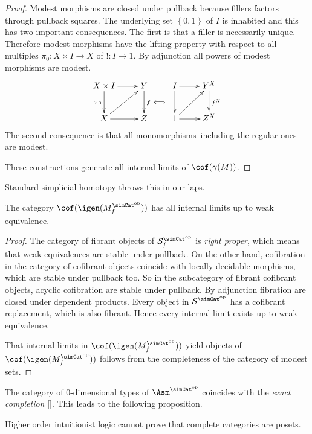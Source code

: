 \documentclass{tac}
\newcommand\cat\mathcal
\newcommand\set[1]{\left\{#1\right\}}
\newcommand\dual{^{\mathrm{op}}}
\newcommand\s{^{\simCat\dual}}
\newcommand\bang{!}
\newcommand\of{:}
\newcommand\f{_f}
\newcommand\gen\gamma
\newcommand\citep[1]{[\cite{#1}]}
\begin{document}
\begin{proof} Modest morphisms are closed under pullback because fillers factors through pullback squares.
The underlying set $\set{0,1}$ of $I$ is inhabited and this has two important consequences. The first is that a filler is necessarily unique. Therefore modest morphisms have the lifting property with respect to all multiples $\pi_0\of X\times I\to X$ of $\bang\of I\to 1$. By adjunction all powers of modest morphisms are modest. 
\[\xymatrix{
X\times I\ar[d]_{\pi_0}\ar[r] & Y\ar[d]^f & I\ar[r]\ar[d] & Y^X\ar[d]^{f^X} \\
X\ar[r]\ar[ur] & Z\ar@{}[ur]|\iff & 1\ar[r]\ar[ur] & Z^X
}\]
The second consequence is that all monomorphisms--including the regular ones--are modest.

These constructions generate all internal limits of $\cof(\gen(M))$.
\end{proof}

Standard simplicial homotopy throws this in our laps.

\begin{proposition} The category $\cof(\igen(M\s\f))$ has all internal limits up to weak equivalence.\label{completeness} \end{proposition}

\begin{proof} The category of fibrant objects of $\cat S\s\f$ is \emph{right proper}, which means that weak equivalences are stable under pullback. On the other hand, cofibration in the category of cofibrant objects coincide with locally decidable morphisms, which are stable under pullback too. So in the subcategory of fibrant cofibrant objects, acyclic cofibration are stable under pullback. By adjunction fibration are closed under dependent products. Every object in $\cat S\s$ has a cofibrant replacement, which is also fibrant. Hence every internal limit exists up to weak equivalence.

That internal limits in $\cof(\igen(M\s\f))$ yield objects of $\cof(\igen(M\s\f))$ follows from the completeness of the category of modest sets.
\end{proof}

The category of 0-dimensional types of $\Asm\s$ coincides with the \emph{exact completion} \citep{MR1600009}. This leads to the following proposition.

\begin{proposition} Higher order intuitionist logic cannot prove that complete categories are posets.\label{consistency} \end{proposition}
\end{document}

